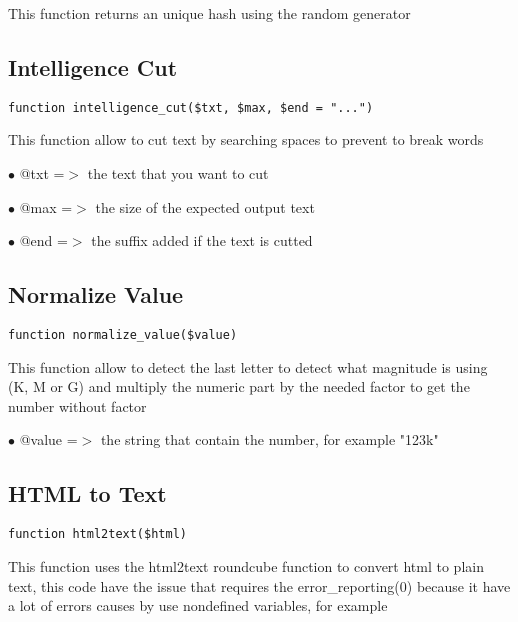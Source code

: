 \documentclass[a4paper]{book}
\begin{document}
This function returns an unique hash using the random generator

\hypertarget{toc275}{}
\subsection{Intelligence Cut}

\begin{lstlisting}
function intelligence_cut($txt, $max, $end = "...")
\end{lstlisting}

This function allow to cut text by searching spaces to prevent to break words

\begin{compactitem}
\item[\color{myblue}$\bullet$] @txt =$>$ the text that you want to cut
\item[\color{myblue}$\bullet$] @max =$>$ the size of the expected output text
\item[\color{myblue}$\bullet$] @end =$>$ the suffix added if the text is cutted
\end{compactitem}

\hypertarget{toc276}{}
\subsection{Normalize Value}

\begin{lstlisting}
function normalize_value($value)
\end{lstlisting}

This function allow to detect the last letter to detect what magnitude is
using (K, M or G) and multiply the numeric part by the needed factor to
get the number without factor

\begin{compactitem}
\item[\color{myblue}$\bullet$] @value =$>$ the string that contain the number, for example "123k"
\end{compactitem}

\hypertarget{toc277}{}
\subsection{HTML to Text}

\begin{lstlisting}
function html2text($html)
\end{lstlisting}

This function uses the html2text roundcube function to convert html to
plain text, this code have the issue that requires the error\_reporting(0)
because it have a lot of errors causes by use nondefined variables, for
example
\end{document}
